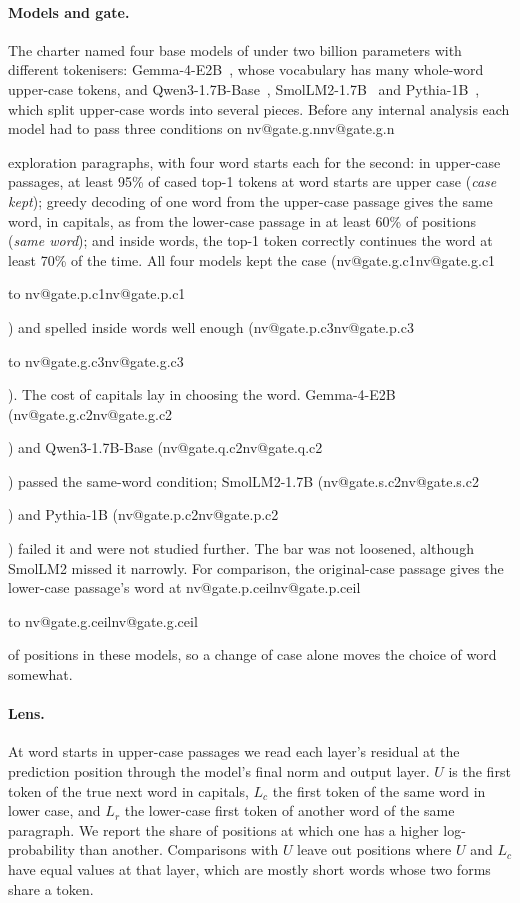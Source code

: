 \documentclass[11pt]{article}
\makeatletter
\newcommand{\nv}[1]{\ifcsname nv@#1\endcsname\csname nv@#1\endcsname\else\PackageError{numbers}{Unknown number key #1}{}\fi}
\newcommand{\gm}{Gemma-4-E2B}
\newcommand{\qw}{Qwen3-1.7B-Base}
\newcommand{\Uc}{\ensuremath{U}}
\newcommand{\Lc}{\ensuremath{L_c}}
\newcommand{\Lr}{\ensuremath{L_r}}
\makeatother
\begin{document}
\paragraph{Models and gate.} The charter named four base models of under two billion parameters with different tokenisers: \gm{}~\citep{gemma2026gemma4}, whose vocabulary has many whole-word upper-case tokens, and \qw{}~\citep{qwen2025qwen3}, SmolLM2-1.7B~\citep{benallal2025smollm2} and Pythia-1B~\citep{biderman2023pythia}, which split upper-case words into several pieces. Before any internal analysis each model had to pass three conditions on \nv{gate.g.n} exploration paragraphs, with four word starts each for the second: in upper-case passages, at least 95\% of cased top-1 tokens at word starts are upper case (\emph{case kept}); greedy decoding of one word from the upper-case passage gives the same word, in capitals, as from the lower-case passage in at least 60\% of positions (\emph{same word}); and inside words, the top-1 token correctly continues the word at least 70\% of the time. All four models kept the case (\nv{gate.g.c1} to \nv{gate.p.c1}) and spelled inside words well enough (\nv{gate.p.c3} to \nv{gate.g.c3}). The cost of capitals lay in choosing the word. \gm{} (\nv{gate.g.c2}) and \qw{} (\nv{gate.q.c2}) passed the same-word condition; SmolLM2-1.7B (\nv{gate.s.c2}) and Pythia-1B (\nv{gate.p.c2}) failed it and were not studied further. The bar was not loosened, although SmolLM2 missed it narrowly. For comparison, the original-case passage gives the lower-case passage's word at \nv{gate.p.ceil} to \nv{gate.g.ceil} of positions in these models, so a change of case alone moves the choice of word somewhat.

\paragraph{Lens.} At word starts in upper-case passages we read each layer's residual at the prediction position through the model's final norm and output layer. \Uc{} is the first token of the true next word in capitals, \Lc{} the first token of the same word in lower case, and \Lr{} the lower-case first token of another word of the same paragraph. We report the share of positions at which one has a higher log-probability than another. Comparisons with \Uc{} leave out positions where \Uc{} and \Lc{} have equal values at that layer, which are mostly short words whose two forms share a token.
\end{document}
